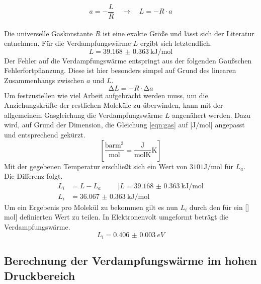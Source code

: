 \begin{equation}
a = -\frac{L}{R} \quad \to \quad L = -R \cdot a
\end{equation}
\\
Die universelle Gaskonstante $R$ ist eine exakte Größe und lässt sich der Literatur \cite{Naturkonstanten} entnehmen.
Für die Verdampfungswärme $L$ ergibt sich letztendlich.
\begin{equation}
L = \SI{39.168(0363)}{\kilo\joule\per\mol}
\end{equation}
Der Fehler auf die Verdampfungswärme entspringt aus der folgenden Gaußschen Fehlerfortpflanzung. Diese ist hier besonders simpel auf Grund des linearen Zusammenhangs zwischen $a$ und $L$. 
\begin{equation}
\increment L = -R \cdot \increment a
\end{equation}
Um festzustellen wie viel Arbeit aufgebracht werden muss, um die Anziehungskräfte der restlichen Moleküle zu überwinden,
kann mit der allgemeinem Gasgleichung die Verdampfungswärme $L$ angenähert werden.
Dazu wird, auf Grund der Dimension, die Gleichung \eqref{eqn:gas} auf [$\si{\joule}/\si{\mol}$] angepasst und entsprechend gekürzt.
\begin{equation}
    \left[\frac{\si{\bar\meter\tothe{3}}}{\si{\mol}}=\frac{\si{\joule}}{\si{\mol\kelvin}}\si{\kelvin}\right]
\end{equation}
Mit der gegebenen Temperatur erschließt sich ein Wert von $3101\si{\joule\per\mol}$ für $L_a$. Die Differenz folgt.
\begin{align*}
    L_i&=L-L_a \hspace{1cm}  | L = \SI{39.168(0363)}{\kilo\joule\per\mol} \\
    L_i&= \SI{36.067(0363)}{\kilo\joule\per\mol}
\end{align*}
Um ein Ergebenis pro Molekül zu bekommen gilt es nun $L_i$ durch den für ein []$\si{\mol}$] definierten Wert zu teilen.
In Elektronenvolt umgeformt beträgt die Verdampfungswärme.
\begin{equation}    
    L_i= \SI{0.406(0003)}{eV}
\end{equation}

\subsection{Berechnung der Verdampfungswärme im hohen Druckbereich}


